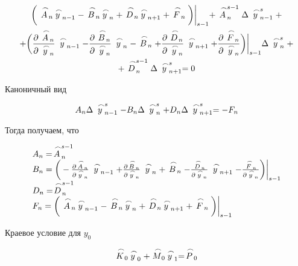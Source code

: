     \begin{multline*}
        \bigg( \LittleCap{A}_n \LittleCap{y}_{n-1} - \LittleCap{B}_n \LittleCap{y}_n + \LittleCap{D}_n \LittleCap{y}_{n+1} + \LittleCap{F}_n \bigg) \bigg|_{s-1} + \LittleCap{A}_n^{s-1} \Delta \LittleCap{y}_{n-1}^{s} + \\
        + \bigg( \frac{\partial \LittleCap{A}_n}{\partial \LittleCap{y}_n} \LittleCap{y}_{n-1} - \frac{\partial \LittleCap{B}_n}{\partial \LittleCap{y}_n} \LittleCap{y}_n - \LittleCap{B}_n + \frac{\partial \LittleCap{D}_n}{\partial \LittleCap{y}_n} \LittleCap{y}_{n+1} + \frac{\partial \LittleCap{F}_n}{\partial \LittleCap{y}_n} \bigg) \bigg|_{s-1} \Delta \LittleCap{y}_{n}^s + \\
        + \LittleCap{D}_n^{s-1} \Delta \LittleCap{y}_{n+1}^s = 0
    \end{multline*}

    Каноничный вид

    \begin{equation*}
        A_n \Delta \LittleCap{y}_{n-1}^s - B_n \Delta\LittleCap{y}_n^s + D_n \Delta \LittleCap{y}_{n+1}^s = -F_n
    \end{equation*}

    Тогда получаем, что

    \begin{equation*}
        \begin{matrix*}[l]
            A_n = \LittleCap{A}_n^{s-1} \\
            B_n = \bigg( -\frac{\partial \LittleCap{A}_n}{\partial \LittleCap{y}_n} \LittleCap{y}_{n-1} + \frac{\partial \LittleCap{B}_n}{\partial \LittleCap{y}_n} \LittleCap{y}_n + \LittleCap{B}_n - \frac{\LittleCap{D}_n}{\partial \LittleCap{y}_n} \LittleCap{y}_{n+1} - \frac{\LittleCap{F}_n}{\partial \LittleCap{y}_n} \bigg) \bigg|_{s-1} \\
            D_n = \LittleCap{D}_n^{s-1} \\
            F_n = \bigg( \LittleCap{A}_n \LittleCap{y}_{n-1} - \LittleCap{B}_n \LittleCap{y}_n + \LittleCap{D}_n \LittleCap{y}_{n+1} + \LittleCap{F}_n \bigg) \bigg|_{s-1} \\
        \end{matrix*}
    \end{equation*}

    Краевое условие для $y_0$

    \begin{equation*}
        \LittleCap{K}_0 \LittleCap{y}_0 + \LittleCap{M}_0 \LittleCap{y}_1 = \LittleCap{P}_0
    \end{equation*}

